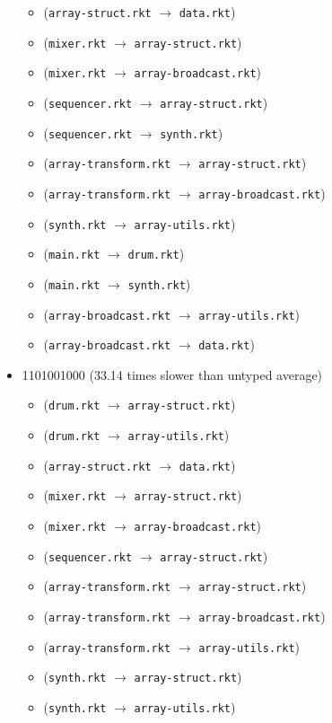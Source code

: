 \documentclass{article}
\newcommand{\mono}[1]{\texttt{#1}}
\begin{document}
\begin{itemize}
\begin{itemize}
  \item (\mono{array-struct.rkt} $\rightarrow$ \mono{data.rkt})
  \item (\mono{mixer.rkt} $\rightarrow$ \mono{array-struct.rkt})
  \item (\mono{mixer.rkt} $\rightarrow$ \mono{array-broadcast.rkt})
  \item (\mono{sequencer.rkt} $\rightarrow$ \mono{array-struct.rkt})
  \item (\mono{sequencer.rkt} $\rightarrow$ \mono{synth.rkt})
  \item (\mono{array-transform.rkt} $\rightarrow$ \mono{array-struct.rkt})
  \item (\mono{array-transform.rkt} $\rightarrow$ \mono{array-broadcast.rkt})
  \item (\mono{synth.rkt} $\rightarrow$ \mono{array-utils.rkt})
  \item (\mono{main.rkt} $\rightarrow$ \mono{drum.rkt})
  \item (\mono{main.rkt} $\rightarrow$ \mono{synth.rkt})
  \item (\mono{array-broadcast.rkt} $\rightarrow$ \mono{array-utils.rkt})
  \item (\mono{array-broadcast.rkt} $\rightarrow$ \mono{data.rkt})
  \end{itemize}
\item 1101001000 (33.14 times slower than untyped average)
  \begin{itemize}
  \item (\mono{drum.rkt} $\rightarrow$ \mono{array-struct.rkt})
  \item (\mono{drum.rkt} $\rightarrow$ \mono{array-utils.rkt})
  \item (\mono{array-struct.rkt} $\rightarrow$ \mono{data.rkt})
  \item (\mono{mixer.rkt} $\rightarrow$ \mono{array-struct.rkt})
  \item (\mono{mixer.rkt} $\rightarrow$ \mono{array-broadcast.rkt})
  \item (\mono{sequencer.rkt} $\rightarrow$ \mono{array-struct.rkt})
  \item (\mono{array-transform.rkt} $\rightarrow$ \mono{array-struct.rkt})
  \item (\mono{array-transform.rkt} $\rightarrow$ \mono{array-broadcast.rkt})
  \item (\mono{array-transform.rkt} $\rightarrow$ \mono{array-utils.rkt})
  \item (\mono{synth.rkt} $\rightarrow$ \mono{array-struct.rkt})
  \item (\mono{synth.rkt} $\rightarrow$ \mono{array-utils.rkt})

\end{itemize}
\end{itemize}
\end{document}
